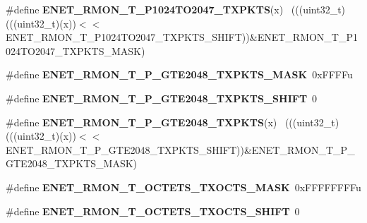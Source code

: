 \begin{DoxyCompactItemize}
\item 
\hypertarget{group___e_n_e_t___register___masks_ga4b6ce0ada5cff713b89f19d52972bda6}{}\#define {\bfseries E\+N\+E\+T\+\_\+\+R\+M\+O\+N\+\_\+\+T\+\_\+\+P1024\+T\+O2047\+\_\+\+T\+X\+P\+K\+T\+S}(x)            ~(((uint32\+\_\+t)(((uint32\+\_\+t)(x))$<$$<$E\+N\+E\+T\+\_\+\+R\+M\+O\+N\+\_\+\+T\+\_\+\+P1024\+T\+O2047\+\_\+\+T\+X\+P\+K\+T\+S\+\_\+\+S\+H\+I\+F\+T))\&E\+N\+E\+T\+\_\+\+R\+M\+O\+N\+\_\+\+T\+\_\+\+P1024\+T\+O2047\+\_\+\+T\+X\+P\+K\+T\+S\+\_\+\+M\+A\+S\+K)\label{group___e_n_e_t___register___masks_ga4b6ce0ada5cff713b89f19d52972bda6}

\item 
\hypertarget{group___e_n_e_t___register___masks_ga6727e73f1f19091ffc8c3677c27cf51c}{}\#define {\bfseries E\+N\+E\+T\+\_\+\+R\+M\+O\+N\+\_\+\+T\+\_\+\+P\+\_\+\+G\+T\+E2048\+\_\+\+T\+X\+P\+K\+T\+S\+\_\+\+M\+A\+S\+K}~0x\+F\+F\+F\+Fu\label{group___e_n_e_t___register___masks_ga6727e73f1f19091ffc8c3677c27cf51c}

\item 
\hypertarget{group___e_n_e_t___register___masks_ga8ebafd824d8947f833675eeed78a3fb1}{}\#define {\bfseries E\+N\+E\+T\+\_\+\+R\+M\+O\+N\+\_\+\+T\+\_\+\+P\+\_\+\+G\+T\+E2048\+\_\+\+T\+X\+P\+K\+T\+S\+\_\+\+S\+H\+I\+F\+T}~0\label{group___e_n_e_t___register___masks_ga8ebafd824d8947f833675eeed78a3fb1}

\item 
\hypertarget{group___e_n_e_t___register___masks_ga66e0c8cbf70537a211d19cfca6550ff0}{}\#define {\bfseries E\+N\+E\+T\+\_\+\+R\+M\+O\+N\+\_\+\+T\+\_\+\+P\+\_\+\+G\+T\+E2048\+\_\+\+T\+X\+P\+K\+T\+S}(x)                ~(((uint32\+\_\+t)(((uint32\+\_\+t)(x))$<$$<$E\+N\+E\+T\+\_\+\+R\+M\+O\+N\+\_\+\+T\+\_\+\+P\+\_\+\+G\+T\+E2048\+\_\+\+T\+X\+P\+K\+T\+S\+\_\+\+S\+H\+I\+F\+T))\&E\+N\+E\+T\+\_\+\+R\+M\+O\+N\+\_\+\+T\+\_\+\+P\+\_\+\+G\+T\+E2048\+\_\+\+T\+X\+P\+K\+T\+S\+\_\+\+M\+A\+S\+K)\label{group___e_n_e_t___register___masks_ga66e0c8cbf70537a211d19cfca6550ff0}

\item 
\hypertarget{group___e_n_e_t___register___masks_ga5ad525f27fd78ec68eefefbff4b87b3a}{}\#define {\bfseries E\+N\+E\+T\+\_\+\+R\+M\+O\+N\+\_\+\+T\+\_\+\+O\+C\+T\+E\+T\+S\+\_\+\+T\+X\+O\+C\+T\+S\+\_\+\+M\+A\+S\+K}~0x\+F\+F\+F\+F\+F\+F\+F\+Fu\label{group___e_n_e_t___register___masks_ga5ad525f27fd78ec68eefefbff4b87b3a}

\item 
\hypertarget{group___e_n_e_t___register___masks_gacd37d2d1ea131990ecfbae1a3c933f92}{}\#define {\bfseries E\+N\+E\+T\+\_\+\+R\+M\+O\+N\+\_\+\+T\+\_\+\+O\+C\+T\+E\+T\+S\+\_\+\+T\+X\+O\+C\+T\+S\+\_\+\+S\+H\+I\+F\+T}~0\label{group___e_n_e_t___register___masks_gacd37d2d1ea131990ecfbae1a3c933f92}


\end{DoxyCompactItemize}
